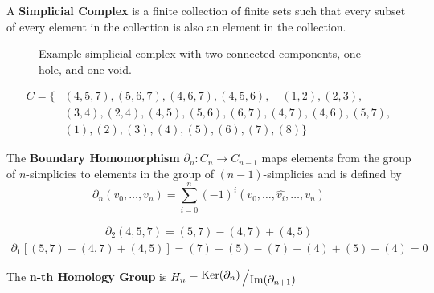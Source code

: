 \begin{frame}
	\begin{definition}
		A \textbf{Simplicial Complex} is a finite collection of finite sets such that every subset of every element in the collection is also an element in the collection. \cite{wagner}
	\end{definition}
	\begin{figure}
		
		\caption{Example simplicial complex with two connected components, one hole, and one void.}
	\end{figure}
	\begin{align*}
		C = \{
			&(4,5,7), (5,6,7), (4,6,7), (4,5,6),\quad (1,2), (2,3),\\ &(3,4), (2,4), (4,5), (5,6),(6,7),(4,7),(4,6),(5,7),\\
			&(1), (2), (3), (4), (5), (6), (7), (8)
		\}
	\end{align*}
\end{frame}

\begin{frame}
	\begin{definition}
		The \textbf{Boundary Homomorphism} \(\partial_n : C_n \to C_{n-1}\) maps elements from the group of \(n\)-simplicies to elements in the group of \((n-1)\)-simplicies and is defined by
		\[
			\partial_n (v_0,\dots , v_{n}) = \sum_{i=0}^n (-1)^{i}
			(v_0,\dots, \widehat{v_i}, \dots, v_n)
		\]
		\cite{hatcher}
	\end{definition}
	\begin{align*}
		\partial_2 (4,5,7) = (5,7) - (4,7) + (4,5)
	\end{align*}
	\begin{align*}
		\partial_1 [(5,7) - (4,7) + (4,5)] = (7) - (5) - (7) + (4) + (5) - (4) = 0
	\end{align*}
\end{frame}

\begin{frame}
	\begin{definition}
		The \textbf{n-th Homology Group} is \(H_n = \bigslant{\Ker(\partial_n)}{\Ima(\partial_{n+1})}\)
		\cite{fraleigha}
	\end{definition}
\end{frame}


